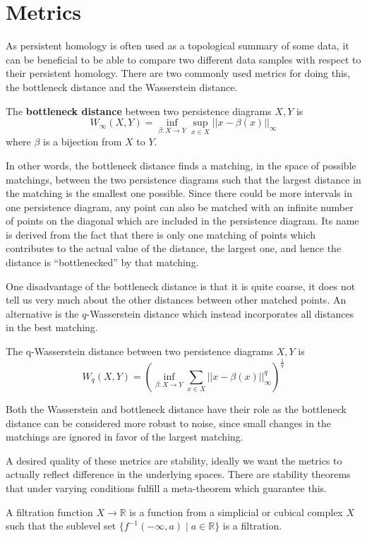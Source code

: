   \section{Metrics}
  As persistent homology is often used as a topological summary of some data, it can be beneficial to be able to compare two different data samples with respect to their persistent homology. There are two commonly used metrics for doing this, the bottleneck distance and the Wasserstein distance.
  \begin{definition}
    The \textbf{bottleneck distance} between two persistence diagrams $X,Y$ is
    \[W_{\infty}(X,Y) = \inf_{\beta: X \to Y} \sup_{x \in X} ||x-\beta(x)||_{\infty}\]
    where $\beta$ is a bijection from $X$ to $Y$.
  \end{definition}
In other words, the bottleneck distance finds a matching, in the space of possible matchings, between the two persistence diagrams such that the largest distance in the matching is the smallest one possible. Since there could be more intervals in one persistence diagram, any point can also be matched with an infinite number of points on the diagonal which are included in the persistence diagram. Its name is derived from the fact that there is only one matching of points which contributes to the actual value of the distance, the largest one, and hence the distance is ``bottlenecked'' by that matching.

One disadvantage of the bottleneck distance is that it is quite coarse, it does not tell us very much about the other distances between other matched points. An alternative is the $q$-Wasserstein distance which instead incorporates all distances in the best matching.
  \begin{definition}
    The q-Wasserstein distance between two persistence diagrams $X,Y$ is
    \[W_{q}(X,Y) = (\inf_{\beta: X \to Y} \sum_{x \in X}  ||x-\beta(x)||_{\infty}^{q})^{\frac{1}{q}}\]
  \end{definition}
  Both the Wasserstein and bottleneck distance have their role as the bottleneck distance can be considered more robust to noise, since small changes in the matchings are ignored in favor of the largest matching.

  A desired quality of these metrics are stability, ideally we want the metrics to actually reflect difference in the underlying spaces. There are stability theorems that under varying conditions fulfill a meta-theorem which guarantee this.

  \begin{definition}
    A filtration function $X \to \mathbb{R}$ is a function from a simplicial or cubical complex $X$ such that the sublevel set $\{ f^{-1}(-\infty,a) \mid a \in \mathbb{R} \}$ is a filtration.
  \end{definition}

